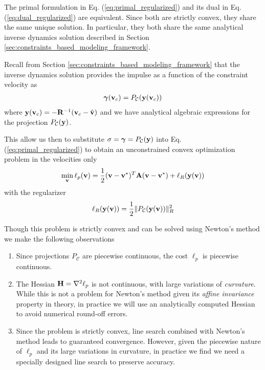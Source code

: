 The primal formulation in Eq. (\ref{eq:primal_regularized}) and its dual in Eq.
(\ref{eq:dual_regularized}) are equivalent. Since both are strictly convex, they
share the same unique solution. In particular, they both share the same
analytical inverse dynamics solution described in Section
\ref{sec:constraints_based_modeling_framework}.

Recall from Section \ref{sec:constraints_based_modeling_framework} that the
inverse dynamics solution provides the impulse as a function of the constraint
velocity as
\begin{eqnarray}
	{\bm\gamma}({\mathbf{v}}_c) = P_\mathcal{C}({\mathbf{y}}({\mathbf{v}}_c))
\end{eqnarray}
where ${\mathbf{y}}({\mathbf{v}}_c) = -{\mathbf{R}}^{-1}({\mathbf{v}}_c-\hat{{\mathbf{v}}})$ and we have
analytical algebraic expressions for the projection $P_\mathcal{C}({\mathbf{y}})$.

This allow us then to substitute ${\mathbf{\sigma}}={\bm\gamma}=P_\mathcal{C}({\mathbf{y}})$
into Eq. (\ref{eq:primal_regularized}) to obtain an unconstrained convex
optimization problem in the velocities only
\begin{eqnarray}
	\min_{\mf{v}} \ell_p(\mf{v}) =
	\frac{1}{2}(\mf{v}-\mf{v}^*)^T\mf{A}(\mf{v}-\mf{v}^*) +
	\ell_R(\mf{y}(\mf{v}))
	\label{eq:primal_unconstrained}
\end{eqnarray}
with the regularizer
\begin{equation}
	\ell_R({\mathbf{y}}({\mathbf{v}})) = \frac{1}{2}\Vert P_\mathcal{C}({\mathbf{y}}({\mathbf{v}}))\Vert_R^2
\end{equation}

Though this problem is strictly convex and can be solved using Newton's method
we make the following observations
\begin{enumerate}
	\item Since projections $P_\mathcal{C}$ are piecewise continuous, the cost
	$\ell_p$ is piecewise continuous.
	\item The Hessian ${\mathbf{H}}=\nabla^2\ell_p$ is not continuous, with large
	variations of \textit{curvature}. While this is not a problem for Newton's
	method given its \textit{affine invariance} property in theory, in practice
	we will use an analytically computed Hessian to avoid numerical round-off
	errors.
	\item\label{item:line_sarch} Since the problem is strictly convex, line
	search combined with Newton's method leads to guaranteed convergence.
	However, given the piecewise nature of $\ell_p$ and its large variations in
	curvature, in practice we find we need a specially designed line search to
	preserve accuracy.
\end{enumerate}

